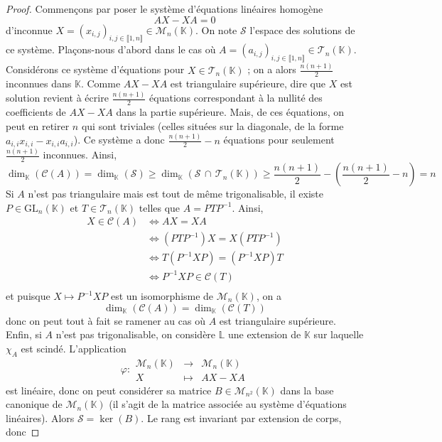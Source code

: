   \begin{proof}
    Commençons par poser le système d'équations linéaires homogène
    \[ AX - XA = 0 \]
    d'inconnue $X = (x_{i,j})_{i,j \in \llbracket 1, n \rrbracket} \in \mathcal{M}_n(\mathbb{K})$. On note $\mathcal{S}$ l'espace des solutions de ce système.
    \newpar
    Plaçons-nous d'abord dans le cas où $A = (a_{i,j})_{i,j \in \llbracket 1, n \rrbracket} \in \mathcal{T}_n(\mathbb{K})$. Considérons ce système d'équations pour $X \in \mathcal{T}_n(\mathbb{K})$ ; on a alors $\frac{n(n+1)}{2}$ inconnues dans $\mathbb{K}$. Comme $AX-XA$ est triangulaire supérieure, dire que $X$ est solution revient à écrire $\frac{n(n+1)}{2}$ équations correspondant à la nullité des coefficients de $AX - XA$ dans la partie supérieure. Mais, de ces équations, on peut en retirer $n$ qui sont triviales (celles situées sur la diagonale, de la forme $a_{i,i} x_{i,i} - x_{i,i} a_{i,i}$). Ce système a donc $\frac{n(n+1)}{2} - n$ équations pour seulement $\frac{n(n+1)}{2}$ inconnues. Ainsi,
    \[ \dim_{\mathbb{K}}(\mathcal{C}(A)) = \dim_{\mathbb{K}}(\mathcal{S}) \geq \dim_{\mathbb{K}}(\mathcal{S} \, \cap \, \mathcal{T}_n(\mathbb{K})) \geq \frac{n(n+1)}{2} - \left( \frac{n(n+1)}{2} - n \right) = n \]
    Si $A$ n'est pas triangulaire mais est tout de même trigonalisable, il existe $P \in \mathrm{GL}_n(\mathbb{K})$ et $T \in \mathcal{T}_n(\mathbb{K})$ telles que $A = PTP^{-1}$. Ainsi,
    \begin{align*}
      X \in \mathcal{C}(A) &\iff AX = XA \\
      &\iff (PTP^{-1}) X = X (PTP^{-1}) \\
      &\iff T (P^{-1}XP) = (P^{-1}XP) T \\
      &\iff P^{-1}XP \in \mathcal{C}(T) \\
    \end{align*}
    et puisque $X \mapsto P^{-1}XP$ est un isomorphisme de $\mathcal{M}_n(\mathbb{K})$, on a
    \[ \dim_{\mathbb{K}}(\mathcal{C}(A)) = \dim_{\mathbb{K}}(\mathcal{C}(T)) \]
    donc on peut tout à fait se ramener au cas où $A$ est triangulaire supérieure.
    \newpar
    Enfin, si $A$ n'est pas trigonalisable, on considère $\mathbb{L}$ une extension de $\mathbb{K}$ sur laquelle $\chi_A$ est scindé. L'application
    \[ \varphi :
    \begin{array}{ccc}
      \mathcal{M}_n(\mathbb{K}) &\rightarrow& \mathcal{M}_n(\mathbb{K}) \\
      X &\mapsto& AX-XA
    \end{array}
    \]
    est linéaire, donc on peut considérer sa matrice $B \in \mathcal{M}_{n^2}(\mathbb{K})$ dans la base canonique de $\mathcal{M}_n(\mathbb{K})$ (il s'agit de la matrice associée au système d'équations linéaires). Alors $\mathcal{S} = \ker(B)$. Le rang est invariant par extension de corps, donc

\end{proof}
